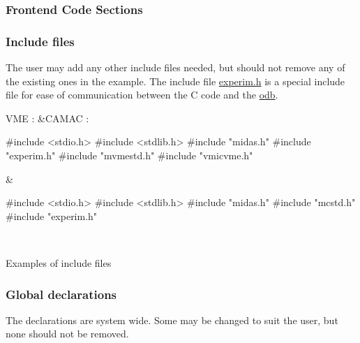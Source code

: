\subsubsection{Frontend Code Sections}\label{FE_code_sections}
\par
  \par
\hypertarget{FE_code_sections_FE_includes}{}\subsubsection{Include files}\label{FE_code_sections_FE_includes}
The user may add any other include files needed, but should not remove any of the existing ones in the example. The include file \hyperlink{RC_Hot_Link_RC_experim_dot_h}{experim.h} is a special include file for ease of communication between the C code and the \hyperlink{F_MainElements_F_Online_Database_overview}{odb}.

\begin{table}[h]\begin{TabularC}{2}
\hline
VME :  &CAMAC :  \\

\begin{DoxyCode}
#include <stdio.h>
#include <stdlib.h>
#include "midas.h"
#include "experim.h"
#include "mvmestd.h"
#include "vmicvme.h"
\end{DoxyCode}
  &
\begin{DoxyCode}
#include <stdio.h>
#include <stdlib.h>
#include "midas.h"
#include "mcstd.h"
#include "experim.h"
\end{DoxyCode}
 \\
\end{TabularC}
\centering
\caption{Examples of include files }
\end{table}


\par


\par
 \hypertarget{FE_code_sections_FE_global}{}\subsubsection{Global declarations}\label{FE_code_sections_FE_global}
The declarations are system wide. Some may be changed to suit the user, but none should not be removed.


